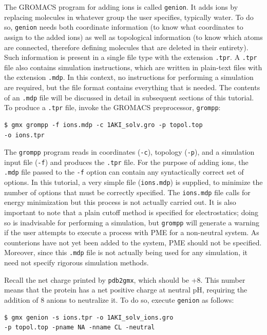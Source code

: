 \documentclass[9pt,tutorial]{livecoms}
\begin{document}
The GROMACS program for adding ions is called \texttt{genion}. It adds ions by replacing molecules in whatever group the user specifies, typically water. To do so, \texttt{genion} needs both coordinate information (to know what coordinates to assign to the added ions) as well as topological information (to know which atoms are connected, therefore defining molecules that are deleted in their entirety). Such information is present in a single file type with the extension \texttt{.tpr}. A \texttt{.tpr} file also contains simulation instructions, which are written in plain-text files with the extension \texttt{.mdp}. In this context, no instructions for performing a simulation are required, but the file format contains everything that is needed. The contents of an \texttt{.mdp} file will be discussed in detail in subsequent sections of this tutorial. To produce a \texttt{.tpr} file, invoke the GROMACS preprocessor, \texttt{grompp}:

\begin{verbatim}
$ gmx grompp -f ions.mdp -c 1AKI_solv.gro -p topol.top 
-o ions.tpr
\end{verbatim}

The \texttt{grompp} program reads in coordinates (\texttt{-c}), topology (\texttt{-p}), and a simulation input file (\texttt{-f}) and produces the \texttt{.tpr} file. For the purpose of adding ions, the \texttt{.mdp} file passed to the \texttt{-f} option can contain any syntactically correct set of options. In this tutorial, a very simple file (\texttt{ions.mdp}) is supplied, to minimize the number of options that must be correctly specified. The \texttt{ions.mdp} file calls for energy minimization but this process is not actually carried out. It is also important to note that a plain cutoff method is specified for electrostatics; doing so is inadvisable for performing a simulation, but \texttt{grompp} will generate a warning if the user attempts to execute a process with PME for a non-neutral system. As counterions have not yet been added to the system, PME should not be specified. Moreover, since this \texttt{.mdp} file is not actually being used for any simulation, it need not specify rigorous simulation methods.

Recall the net charge printed by \texttt{pdb2gmx}, which should be +8. This number means that the protein has a net positive charge at neutral pH, requiring the addition of 8 anions to neutralize it. To do so, execute \texttt{genion} as follows:

\begin{verbatim}
$ gmx genion -s ions.tpr -o 1AKI_solv_ions.gro 
-p topol.top -pname NA -nname CL -neutral
\end{verbatim}
\end{document}
